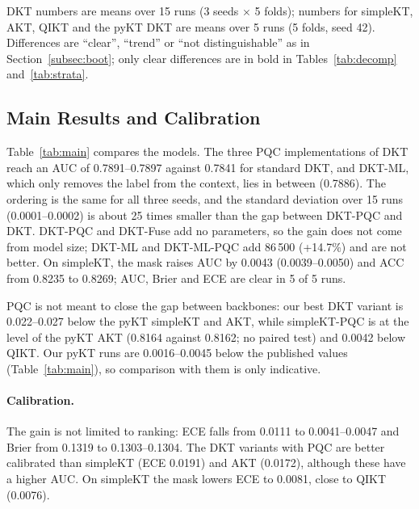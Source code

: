 DKT numbers are means over 15 runs (3 seeds $\times$ 5 folds); numbers for simpleKT, AKT, QIKT and the pyKT DKT are means over 5 runs (5 folds, seed 42).
Differences are ``clear'', ``trend'' or ``not distinguishable'' as in Section~\ref{subsec:boot}; only clear differences are in bold in Tables~\ref{tab:decomp} and~\ref{tab:strata}.

\subsection{Main Results and Calibration}
\label{subsec:res-main}

\begin{table}[tbp]
  \caption{Main results on XES3G5M (mean over runs; $\pm$ is the sd over runs; DKT variants 15 runs, other models 5 runs). ACC uses a threshold of 0.5 and is not tested. Paired tests: Table~\ref{tab:decomp} (DKT) and Sect.~\ref{subsec:res-skt} (simpleKT). ``Ref.\ AUC'': value published for the pyKT model on XES3G5M.}
  \label{tab:main}
  \centering
  \scriptsize
  \setlength{\tabcolsep}{3pt}
  \resizebox{\textwidth}{!}{%
  }
\end{table}

Table~\ref{tab:main} compares the models. The three PQC implementations of DKT reach an AUC of 0.7891--0.7897 against 0.7841 for standard DKT, and DKT-ML, which only removes the label from the context, lies in between (0.7886).
The ordering is the same for all three seeds, and the standard deviation over 15 runs (0.0001--0.0002) is about 25 times smaller than the gap between DKT-PQC and DKT.
DKT-PQC and DKT-Fuse add no parameters, so the gain does not come from model size; DKT-ML and DKT-ML-PQC add 86\,500 (+14.7\%) and are not better.
On simpleKT, the mask raises AUC by 0.0043 (0.0039--0.0050) and ACC from 0.8235 to 0.8269; AUC, Brier and ECE are clear in 5 of 5 runs.

PQC is not meant to close the gap between backbones: our best DKT variant is 0.022--0.027 below the pyKT simpleKT and AKT, while simpleKT-PQC is at the level of the pyKT AKT (0.8164 against 0.8162; no paired test) and 0.0042 below QIKT. Our pyKT runs are 0.0016--0.0045 below the published values (Table~\ref{tab:main}), so comparison with them is only indicative.

\paragraph{Calibration.}
The gain is not limited to ranking: ECE falls from 0.0111 to 0.0041--0.0047 and Brier from 0.1319 to 0.1303--0.1304.
The DKT variants with PQC are better calibrated than simpleKT (ECE 0.0191) and AKT (0.0172), although these have a higher AUC. On simpleKT the mask lowers ECE to 0.0081, close to QIKT (0.0076).

